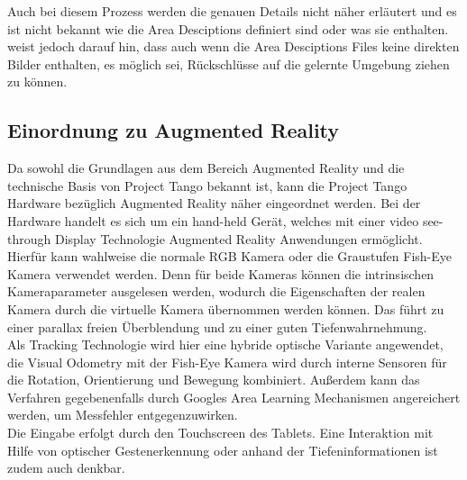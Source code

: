 Auch bei diesem Prozess werden die genauen Details nicht näher erläutert und es ist nicht bekannt wie die Area Desciptions definiert sind oder was sie enthalten. \citep{GoogleDevelopersConcepts:online} weist jedoch darauf hin, dass auch wenn die Area Desciptions Files keine direkten Bilder enthalten, es möglich sei, Rückschlüsse auf die gelernte Umgebung ziehen zu können. \\

\subsection{Einordnung zu Augmented Reality} \label{sec:classification_project_tango}

Da sowohl die Grundlagen aus dem Bereich Augmented Reality und die technische Basis von Project Tango bekannt ist, kann die Project Tango Hardware bezüglich Augmented Reality näher eingeordnet werden. Bei der Hardware handelt es sich um ein hand-held Gerät, welches mit einer video see-through Display Technologie Augmented Reality Anwendungen ermöglicht. Hierfür kann wahlweise die normale RGB Kamera oder die Graustufen Fish-Eye Kamera verwendet werden. Denn für beide Kameras können die intrinsischen Kameraparameter ausgelesen werden, wodurch die Eigenschaften der realen Kamera durch die virtuelle Kamera übernommen werden können. Das führt zu einer parallax freien Überblendung und zu einer guten Tiefenwahrnehmung. \\

Als Tracking Technologie wird hier eine hybride optische Variante angewendet, die Visual Odometry mit der Fish-Eye Kamera wird durch interne Sensoren für die Rotation, Orientierung und Bewegung kombiniert. Außerdem kann das Verfahren gegebenenfalls durch Googles Area Learning Mechanismen angereichert werden, um Messfehler entgegenzuwirken. \\

Die Eingabe erfolgt durch den Touchscreen des Tablets. Eine Interaktion mit Hilfe von optischer Gestenerkennung oder anhand der Tiefeninformationen ist zudem auch denkbar. \\


